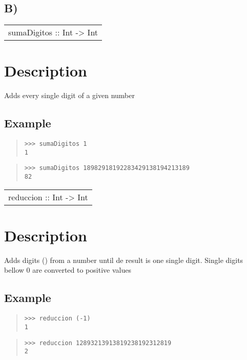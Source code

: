 \subsection{B)}
\begin{haddockdesc}
\item[\begin{tabular}{@{}l}
sumaDigitos :: Int -> Int
\end{tabular}]
{\haddockbegindoc
\section*{Description}
Adds every single digit of a given number\par
\subsection*{Example}
\begin{quote}
{\haddockverb\begin{verbatim}
>>> sumaDigitos 1
1

\end{verbatim}}
\end{quote}
\begin{quote}
{\haddockverb\begin{verbatim}
>>> sumaDigitos 18982918192283429138194213189
82

\end{verbatim}}
\end{quote}}
\end{haddockdesc}
\begin{haddockdesc}
\item[\begin{tabular}{@{}l}
reduccion :: Int -> Int
\end{tabular}]
{\haddockbegindoc
\section*{Description}
Adds digits () from a number until de result is one single digit. Single digits bellow 0 are converted to positive values\par
\subsection*{Example}
\begin{quote}
{\haddockverb\begin{verbatim}
>>> reduccion (-1)
1

\end{verbatim}}
\end{quote}
\begin{quote}
{\haddockverb\begin{verbatim}
>>> reduccion 12893213913819238192312819
2

\end{verbatim}}
\end{quote}}
\end{haddockdesc}
